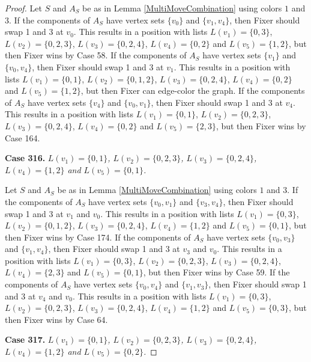 \documentclass[12pt]{amsart}
\theoremstyle{plain}
\theoremstyle{definition}
\theoremstyle{remark}
\begin{document}
\begin{proof}
Let $S$ and $A_S$ be as in Lemma \ref{MultiMoveCombination} using colors $1$ and $3$. If the components of $A_S$ have vertex sets $\{v_0\}$ and $\{v_1, v_4\}$, then Fixer should swap 1 and 3 at $v_0$. This results in a position with lists $L(v_1) = \{0, 3\}$, $L(v_2) = \{0, 2, 3\}$, $L(v_3) = \{0, 2, 4\}$, $L(v_4) = \{0, 2\}$ and $L(v_5) = \{1, 2\}$, but then Fixer wins by Case 58. If the components of $A_S$ have vertex sets $\{v_1\}$ and $\{v_0, v_4\}$, then Fixer should swap 1 and 3 at $v_1$. This results in a position with lists $L(v_1) = \{0, 1\}$, $L(v_2) = \{0, 1, 2\}$, $L(v_3) = \{0, 2, 4\}$, $L(v_4) = \{0, 2\}$ and $L(v_5) = \{1, 2\}$, but then Fixer can edge-color the graph. If the components of $A_S$ have vertex sets $\{v_4\}$ and $\{v_0, v_1\}$, then Fixer should swap 1 and 3 at $v_4$. This results in a position with lists $L(v_1) = \{0, 1\}$, $L(v_2) = \{0, 2, 3\}$, $L(v_3) = \{0, 2, 4\}$, $L(v_4) = \{0, 2\}$ and $L(v_5) = \{2, 3\}$, but then Fixer wins by Case 164. 

\noindent\textbf{Case 316.  }\textit{$L(v_1) = \{0, 1\}$, $L(v_2) = \{0, 2, 3\}$, $L(v_3) = \{0, 2, 4\}$, $L(v_4) = \{1, 2\}$ and $L(v_5) = \{0, 1\}$.}

Let $S$ and $A_S$ be as in Lemma \ref{MultiMoveCombination} using colors $1$ and $3$. If the components of $A_S$ have vertex sets $\{v_0, v_1\}$ and $\{v_3, v_4\}$, then Fixer should swap 1 and 3 at $v_1$ and $v_0$. This results in a position with lists $L(v_1) = \{0, 3\}$, $L(v_2) = \{0, 1, 2\}$, $L(v_3) = \{0, 2, 4\}$, $L(v_4) = \{1, 2\}$ and $L(v_5) = \{0, 1\}$, but then Fixer wins by Case 174. If the components of $A_S$ have vertex sets $\{v_0, v_3\}$ and $\{v_1, v_4\}$, then Fixer should swap 1 and 3 at $v_3$ and $v_0$. This results in a position with lists $L(v_1) = \{0, 3\}$, $L(v_2) = \{0, 2, 3\}$, $L(v_3) = \{0, 2, 4\}$, $L(v_4) = \{2, 3\}$ and $L(v_5) = \{0, 1\}$, but then Fixer wins by Case 59. If the components of $A_S$ have vertex sets $\{v_0, v_4\}$ and $\{v_1, v_3\}$, then Fixer should swap 1 and 3 at $v_4$ and $v_0$. This results in a position with lists $L(v_1) = \{0, 3\}$, $L(v_2) = \{0, 2, 3\}$, $L(v_3) = \{0, 2, 4\}$, $L(v_4) = \{1, 2\}$ and $L(v_5) = \{0, 3\}$, but then Fixer wins by Case 64. 

\noindent\textbf{Case 317.  }\textit{$L(v_1) = \{0, 1\}$, $L(v_2) = \{0, 2, 3\}$, $L(v_3) = \{0, 2, 4\}$, $L(v_4) = \{1, 2\}$ and $L(v_5) = \{0, 2\}$.}


\end{proof}
\end{document}
